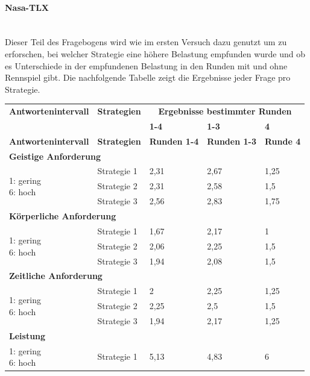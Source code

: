 \documentclass[12pt,a4paper]{scrartcl}
\begin{document}
\paragraph{Nasa-TLX}
~\\
Dieser Teil des Fragebogens wird wie im ersten Versuch dazu genutzt um zu erforschen, bei welcher Strategie eine höhere Belastung empfunden wurde und ob es Unterschiede in der empfundenen Belastung in den Runden mit und ohne Rennspiel gibt. 
Die nachfolgende Tabelle zeigt die Ergebnisse jeder Frage pro Strategie.
\newpage
\begin{longtable}{|p{4cm}|p{2cm}|p{2cm}|p{2cm}|p{2cm}|}
	\hline
		\textbf{Antwortenintervall}&\textbf{Strategien}&\multicolumn{3}{c|}{\textbf{Ergebnisse bestimmter Runden}}\\
	&&\textbf{1-4}&\textbf{1-3} &\textbf{4}\\
	\hline
	\endfirsthead
	\hline
	\textbf{Antwortenintervall}&\textbf{Strategien}&\textbf{Runden 1-4}&\textbf{Runden 1-3} &\textbf{Runde 4}\\
	\hline
	\endhead
		\multicolumn{5}{l}{\textbf{Geistige Anforderung}}\\
		\hline
\multirow{3}{4cm}{1: gering \newline 6: hoch} & Strategie 1 &  2,31 & 2,67 & 1,25 \\
 & Strategie 2 & 2,31 & 2,58 & 1,5\\
 & Strategie 3 & 2,56 & 2,83 & 1,75 \\
\hline
		\multicolumn{5}{l}{\textbf{Körperliche Anforderung}}\\
		\hline
\multirow{3}{4cm}{1: gering \newline 6: hoch} & Strategie 1 & 1,67 & 2,17 & 1 \\
 & Strategie 2 & 2,06 & 2,25 & 1,5 \\
 & Strategie 3 & 1,94 & 2,08 & 1,5 \\
\hline
		\multicolumn{5}{l}{\textbf{Zeitliche Anforderung}}\\
		\hline
\multirow{3}{4cm}{1: gering \newline 6: hoch} & Strategie 1 & 2 & 2,25 & 1,25 \\
 & Strategie 2 & 2,25 & 2,5 & 1,5 \\
 & Strategie 3 & 1,94 & 2,17 & 1,25 \\
\hline
		\multicolumn{5}{l}{\textbf{Leistung}}\\
		\hline
\multirow{3}{4cm}{1: gering \newline 6: hoch} & Strategie 1 & 5,13 & 4,83 & 6 \\

\end{longtable}
\end{document}
